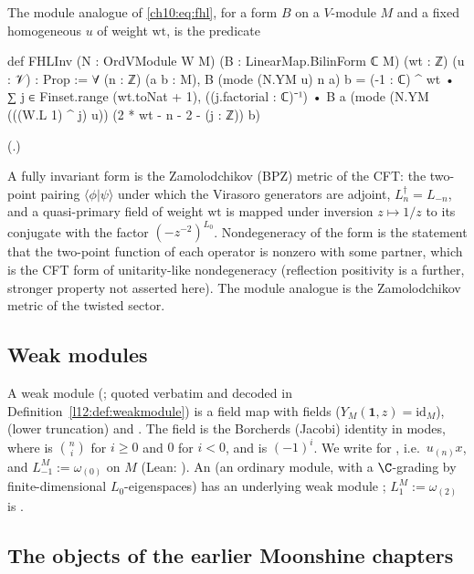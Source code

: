 The module analogue of \eqref{ch10:eq:fhl}, for a form $B$ on a $V$-module $M$ and a fixed
homogeneous $u$ of weight $\mathrm{wt}$, is the predicate
\begin{leancode}
def FHLInv (N : OrdVModule W M) (B : LinearMap.BilinForm ℂ M) (wt : ℤ) (u : 𝒱) : Prop :=
  ∀ (n : ℤ) (a b : M), B (mode (N.YM u) n a) b
    = (-1 : ℂ) ^ wt • ∑ j ∈ Finset.range (wt.toNat + 1), ((j.factorial : ℂ)⁻¹) •
        B a (mode (N.YM (((W.L 1) ^ j) u)) (2 * wt - n - 2 - (j : ℤ)) b)
\end{leancode}
(.)

\begin{physics}
A fully invariant form is the Zamolodchikov (BPZ) metric of the CFT: the two-point pairing $\langle\phi|\psi\rangle$ under which the Virasoro generators are adjoint, $L_n^\dagger=L_{-n}$, and a quasi-primary field of weight $\mathrm{wt}$ is mapped under inversion $z\mapsto1/z$ to its conjugate with the factor $(-z^{-2})^{L_0}$. Nondegeneracy of the form is the statement that the two-point function of each operator is nonzero with some partner, which is the CFT form of unitarity-like nondegeneracy (reflection positivity is a further, stronger property not asserted here). The module analogue is the Zamolodchikov metric of the twisted sector.
\end{physics}

\subsection{Weak modules}

A weak module  (; quoted verbatim and
decoded in Definition~\ref{l12:def:weakmodule}) is a field map 
with fields  ($Y_M(\mathbf 1,z)=\mathrm{id}_M$),  (lower
truncation) and .  The  field is the Borcherds (Jacobi)
identity in modes, where  is $\binom ni$ for $i\ge0$ and $0$ for $i<0$, and
 is $(-1)^i$.  We write  for , i.e.\
$u_{(n)}x$, and $L^M_{-1}:=\omega_{(0)}$ on $M$ (Lean: ).  An  (an
ordinary module, with a $\C$-grading \lean{weight} by finite-dimensional $L_0$-eigenspaces) has an
underlying weak module \lean{toWeakModule}; $L_1^M:=\omega_{(2)}$ is \lean{Lp1}.

\subsection{The objects of the earlier Moonshine chapters}

